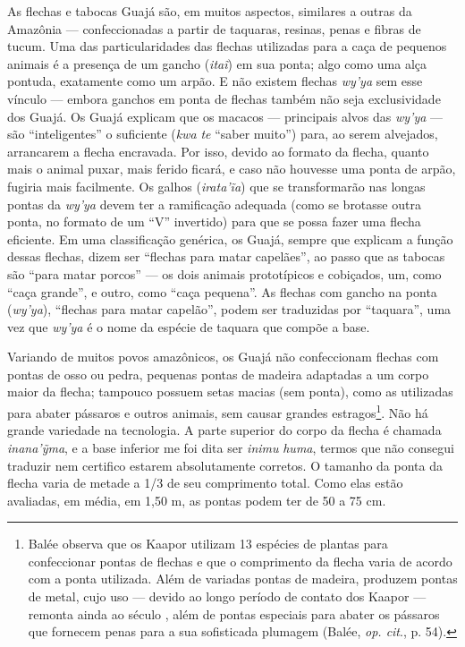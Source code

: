 As flechas e tabocas Guajá são, em muitos aspectos, similares a outras
da Amazônia --- confeccionadas a partir de taquaras, resinas, penas e
fibras de tucum. Uma das particularidades das flechas utilizadas para a
caça de pequenos animais é a presença de um gancho (\emph{itaĩ}) em sua
ponta; algo como uma alça pontuda, exatamente como um arpão. E não
existem flechas \emph{wy'ya} sem esse vínculo --- embora ganchos em ponta
de flechas também não seja exclusividade dos Guajá. Os Guajá explicam
que os macacos --- principais alvos das \emph{wy'ya} --- são ``inteligentes''
o suficiente (\emph{kwa} \emph{te} ``saber muito'') para, ao serem
alvejados, arrancarem a flecha encravada. Por isso, devido ao formato da
flecha, quanto mais o animal puxar, mais ferido ficará, e caso não
houvesse uma ponta de arpão, fugiria mais facilmente. Os galhos
(\emph{irata'ĩa}) que se transformarão nas longas pontas da \emph{wy'ya}
devem ter a ramificação adequada (como se brotasse outra ponta, no
formato de um ``V'' invertido) para que se possa fazer uma flecha
eficiente. Em uma classificação genérica, os Guajá, sempre que explicam
a função dessas flechas, dizem ser ``flechas para matar capelães'', ao
passo que as tabocas são ``para matar porcos'' --- os dois animais
prototípicos e cobiçados, um, como ``caça grande'', e outro, como ``caça
pequena''. As flechas com gancho na ponta (\emph{wy'ya}), ``flechas para
matar capelão'', podem ser traduzidas por ``taquara'', uma vez que
\emph{wy'ya} é o nome da espécie de taquara que compõe a base.

Variando de muitos povos amazônicos, os Guajá não confeccionam flechas
com pontas de osso ou pedra, pequenas pontas de madeira adaptadas a um
corpo maior da flecha; tampouco possuem setas macias (sem ponta), como
as utilizadas para abater pássaros e outros animais, sem causar grandes
estragos\footnote{Balée observa que os Kaapor utilizam 13 espécies de
  plantas para confeccionar pontas de flechas e que o comprimento da
  flecha varia de acordo com a ponta utilizada. Além de variadas pontas
  de madeira, produzem pontas de metal, cujo uso --- devido ao longo
  período de contato dos Kaapor --- remonta ainda ao século , além de
  pontas especiais para abater os pássaros que fornecem penas para a sua
  sofisticada plumagem (Balée, \emph{op. cit}., p. 54).}. Não há grande variedade
na tecnologia. A parte superior do corpo da flecha é chamada
\emph{inana'ỹma}, e a base inferior me foi dita ser \emph{inimu}
\emph{huma}, termos que não consegui traduzir nem certifico estarem
absolutamente corretos. O tamanho da ponta da flecha varia de metade a
1/3 de seu comprimento total. Como elas estão avaliadas, em média, em
1,50 m, as pontas podem ter de 50 a 75 cm.

